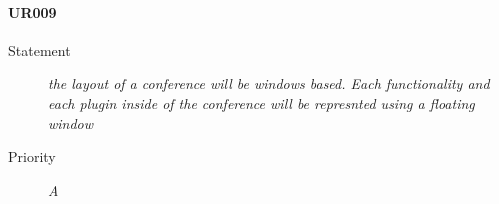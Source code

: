\paragraph{UR009}
\begin{description}
  \item [Statement] 
    \textit{the layout of a conference will be windows based. Each functionality and each plugin inside of the conference will be represnted using a floating window}
  \item [Priority] \textit{A}
\end{description}


